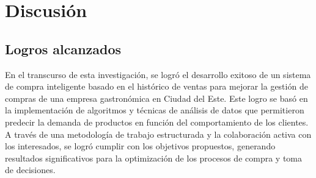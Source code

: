 \fancyhead{}
\fancyfoot{}
\cfoot{\thepage}


\chapter{Discusión}


\section{Logros alcanzados}
En el transcurso de esta investigación, se logró el desarrollo exitoso de un sistema de compra inteligente basado en el histórico de ventas para mejorar la gestión de compras de una empresa gastronómica en Ciudad del Este. Este logro se basó en la implementación de algoritmos y técnicas de análisis de datos que permitieron predecir la demanda de productos en función del comportamiento de los clientes. A través de una metodología de trabajo estructurada y la colaboración activa con los interesados, se logró cumplir con los objetivos propuestos, generando resultados significativos para la optimización de los procesos de compra y toma de decisiones.

